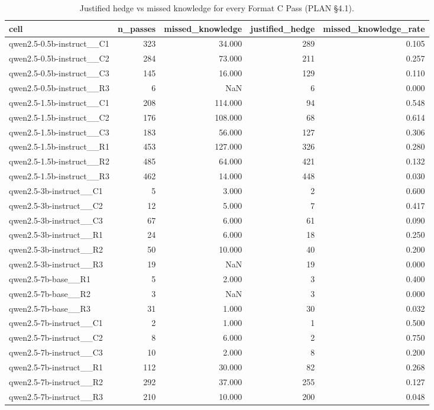 \begin{table}
\caption{Justified hedge vs missed knowledge for every Format C Pass (PLAN §4.1).}
\label{tab:t11_abstention_split}
\begin{tabular}{lrrrr}
\toprule
cell & n\_passes & missed\_knowledge & justified\_hedge & missed\_knowledge\_rate \\
\midrule
qwen2.5-0.5b-instruct\_\_C1 & 323 & 34.000 & 289 & 0.105 \\
qwen2.5-0.5b-instruct\_\_C2 & 284 & 73.000 & 211 & 0.257 \\
qwen2.5-0.5b-instruct\_\_C3 & 145 & 16.000 & 129 & 0.110 \\
qwen2.5-0.5b-instruct\_\_R3 & 6 & NaN & 6 & 0.000 \\
qwen2.5-1.5b-instruct\_\_C1 & 208 & 114.000 & 94 & 0.548 \\
qwen2.5-1.5b-instruct\_\_C2 & 176 & 108.000 & 68 & 0.614 \\
qwen2.5-1.5b-instruct\_\_C3 & 183 & 56.000 & 127 & 0.306 \\
qwen2.5-1.5b-instruct\_\_R1 & 453 & 127.000 & 326 & 0.280 \\
qwen2.5-1.5b-instruct\_\_R2 & 485 & 64.000 & 421 & 0.132 \\
qwen2.5-1.5b-instruct\_\_R3 & 462 & 14.000 & 448 & 0.030 \\
qwen2.5-3b-instruct\_\_C1 & 5 & 3.000 & 2 & 0.600 \\
qwen2.5-3b-instruct\_\_C2 & 12 & 5.000 & 7 & 0.417 \\
qwen2.5-3b-instruct\_\_C3 & 67 & 6.000 & 61 & 0.090 \\
qwen2.5-3b-instruct\_\_R1 & 24 & 6.000 & 18 & 0.250 \\
qwen2.5-3b-instruct\_\_R2 & 50 & 10.000 & 40 & 0.200 \\
qwen2.5-3b-instruct\_\_R3 & 19 & NaN & 19 & 0.000 \\
qwen2.5-7b-base\_\_R1 & 5 & 2.000 & 3 & 0.400 \\
qwen2.5-7b-base\_\_R2 & 3 & NaN & 3 & 0.000 \\
qwen2.5-7b-base\_\_R3 & 31 & 1.000 & 30 & 0.032 \\
qwen2.5-7b-instruct\_\_C1 & 2 & 1.000 & 1 & 0.500 \\
qwen2.5-7b-instruct\_\_C2 & 8 & 6.000 & 2 & 0.750 \\
qwen2.5-7b-instruct\_\_C3 & 10 & 2.000 & 8 & 0.200 \\
qwen2.5-7b-instruct\_\_R1 & 112 & 30.000 & 82 & 0.268 \\
qwen2.5-7b-instruct\_\_R2 & 292 & 37.000 & 255 & 0.127 \\
qwen2.5-7b-instruct\_\_R3 & 210 & 10.000 & 200 & 0.048 \\
\bottomrule
\end{tabular}
\end{table}
